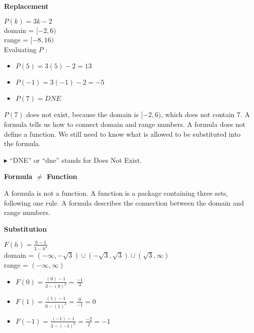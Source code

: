 \documentclass{ximera}
\begin{document}
  
\begin{procedure}   \textbf{\textcolor{purple!85!blue}{Replacement}}    

$P(k) = 3k - 2$ \\
domain = $[-2, 6)$ \\
range = $[-8, 16)$ \\

Evaluating $P$ :
\begin{itemize}
\item $P(5) = 3(5) - 2 = 13$
\item $P(-1) = 3(-1) - 2 = -5$
\item $P(7) = DNE$
\end{itemize}


$P(7)$ does not exist, because the domain is $[-2, 6)$, which does not contain $7$.  A formula tells us how to connect domain and range numbers.  A formula does not define a function.  We still need to know what is allowed to be substituted into the formula.

\end{procedure}
$\blacktriangleright$ ``DNE'' or ``dne'' stands for Does Not Exist. 



\begin{warning}  \textbf{\textcolor{red!70!darkgray}{Formula $\ne$ Function}}   

A formula is not a function.  A function is a package containing three sets, following one rule.  A formula describes the connection between the domain and range numbers.

\end{warning}





\begin{procedure}   \textbf{\textcolor{purple!85!blue}{Substitution}}      

$F(h) = \frac{h-1}{3-h^2}$ \\
domain = $(-\infty, -\sqrt{3}) \cup (-\sqrt{3}, \sqrt{3}) \cup (\sqrt{3}, \infty)$ \\
range = $(-\infty, \infty)$


\begin{itemize}
\item $F(0) = \frac{(0) - 1}{3 - (0)^2} = \frac{-1}{3}$
\item $F(1) = \frac{(1) - 1}{0 - (1)^2} = \frac{0}{-1} = 0$
\item $F(-1) = \frac{(-1) - 1}{3 - (-1)^2} = \frac{-2}{2} = -1$
\end{itemize}

\end{procedure}
\end{document}
